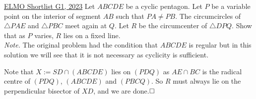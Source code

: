 \begin{problem}{14}{\href{https://artofproblemsolving.com/community/c6h3100572p28033718}{ELMO Shortlist G1, 2023}} 
	Let $ABCDE$ be a cyclic pentagon. Let $P$ be a variable point on the interior of segment $AB$ such that $PA\ne PB$. The circumcircles of $\triangle PAE$ and $\triangle PBC$ meet again at $Q$. Let $R$ be the circumcenter of $\triangle DPQ$. Show that as $P$ varies, $R$ lies on a fixed line.\\
	\emph{Note.} The original problem had the condition that $ABCDE$ is regular but in this solution we will see that it is not necessary as cyclicity is sufficient.
	\begin{solution} Note that $X:=SD\cap (ABCDE)$ lies on $(PDQ)$ as $AE\cap BC$ is the radical centre of $(PDQ)$, $(ABCDE)$ and $(PBCQ)$. So $R$ must always lie on the perpendicular bisector of $XD$, and we are done.$\qedwhite$
	\end{solution}
\end{problem}

